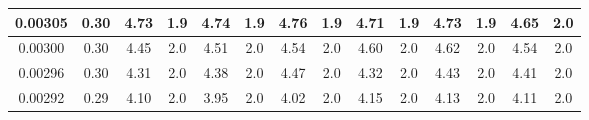 \begin{table}[H]
{\begin{tabular}{|c|c|cccccccccccc|}
0.00305                                            & 0.30                                                                  & \multicolumn{1}{c|}{4.73}    & \multicolumn{1}{c|}{1.9}                                & \multicolumn{1}{c|}{4.74}      & \multicolumn{1}{c|}{1.9}                                & \multicolumn{1}{c|}{4.76}      & \multicolumn{1}{c|}{1.9}                                & \multicolumn{1}{c|}{4.71}      & \multicolumn{1}{c|}{1.9}                                & \multicolumn{1}{c|}{4.73}      & \multicolumn{1}{c|}{1.9}                                & \multicolumn{1}{c|}{4.65}      & 2.0                                \\ \hline
0.00300                                            & 0.30                                                                  & \multicolumn{1}{c|}{4.45}    & \multicolumn{1}{c|}{2.0}                                & \multicolumn{1}{c|}{4.51}      & \multicolumn{1}{c|}{2.0}                                & \multicolumn{1}{c|}{4.54}      & \multicolumn{1}{c|}{2.0}                                & \multicolumn{1}{c|}{4.60}      & \multicolumn{1}{c|}{2.0}                                & \multicolumn{1}{c|}{4.62}      & \multicolumn{1}{c|}{2.0}                                & \multicolumn{1}{c|}{4.54}      & 2.0                                \\ \hline
0.00296                                            & 0.30                                                                  & \multicolumn{1}{c|}{4.31}    & \multicolumn{1}{c|}{2.0}                                & \multicolumn{1}{c|}{4.38}      & \multicolumn{1}{c|}{2.0}                                & \multicolumn{1}{c|}{4.47}      & \multicolumn{1}{c|}{2.0}                                & \multicolumn{1}{c|}{4.32}      & \multicolumn{1}{c|}{2.0}                                & \multicolumn{1}{c|}{4.43}      & \multicolumn{1}{c|}{2.0}                                & \multicolumn{1}{c|}{4.41}      & 2.0                                \\ \hline
0.00292                                            & 0.29                                                                  & \multicolumn{1}{c|}{4.10}    & \multicolumn{1}{c|}{2.0}                                & \multicolumn{1}{c|}{3.95}      & \multicolumn{1}{c|}{2.0}                                & \multicolumn{1}{c|}{4.02}      & \multicolumn{1}{c|}{2.0}                                & \multicolumn{1}{c|}{4.15}      & \multicolumn{1}{c|}{2.0}                                & \multicolumn{1}{c|}{4.13}      & \multicolumn{1}{c|}{2.0}                                & \multicolumn{1}{c|}{4.11}      & 2.0                                \\ \hline
\end{tabular}}
\end{table}

